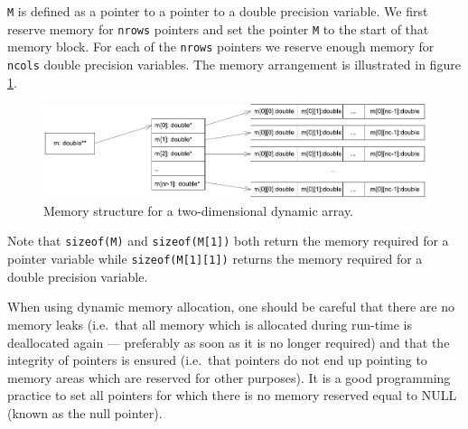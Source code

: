 \verb+M+ is defined as a pointer  to a pointer to a double precision variable.
  
 
We first reserve memory for \verb+nrows+ pointers and set the pointer \verb+M+ to the
start of that memory block. For each of the \verb+nrows+ pointers we reserve
enough memory for \verb+ncols+ double precision variables. The memory arrangement
is illustrated in figure \ref{figDynamicArray2D}.

  \begin{figure}[htb]
    \begin{center}  
      \includegraphics{BasicCPP/Figures/DynamicArray2D.pdf}
    \end{center}  
    \caption{Memory structure for a two-dimensional dynamic array.
             \label{figDynamicArray2D}} 
  \end{figure}


Note that \verb+sizeof(M)+ and \verb+sizeof(M[1])+ both return the memory required
for a pointer variable while \verb+sizeof(M[1][1])+ returns the memory required for
a double precision variable. 

When using dynamic memory allocation, one should be careful that there are no
 
memory leaks (i.e.\ that all memory which is allocated during run-time is
deallocated again --- preferably as soon as it is no longer required) and that
the integrity of pointers is ensured (i.e.\ that pointers do not end up pointing to
memory areas which are reserved for other purposes). It is a good programming
practice to set all pointers for which there is no memory reserved equal to NULL
 (known as the null pointer).

